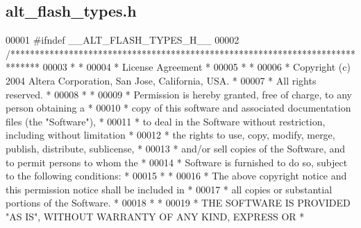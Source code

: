 \subsection{alt\+\_\+flash\+\_\+types.\+h}
\label{alt__flash__types_8h_source}

\begin{DoxyCode}
00001 \textcolor{preprocessor}{#ifndef \_\_ALT\_FLASH\_TYPES\_H\_\_}
00002 \textcolor{comment}{/******************************************************************************}
00003 \textcolor{comment}{*                                                                             *}
00004 \textcolor{comment}{* License Agreement                                                           *}
00005 \textcolor{comment}{*                                                                             *}
00006 \textcolor{comment}{* Copyright (c) 2004 Altera Corporation, San Jose, California, USA.           *}
00007 \textcolor{comment}{* All rights reserved.                                                        *}
00008 \textcolor{comment}{*                                                                             *}
00009 \textcolor{comment}{* Permission is hereby granted, free of charge, to any person obtaining a     *}
00010 \textcolor{comment}{* copy of this software and associated documentation files (the "Software"),  *}
00011 \textcolor{comment}{* to deal in the Software without restriction, including without limitation   *}
00012 \textcolor{comment}{* the rights to use, copy, modify, merge, publish, distribute, sublicense,    *}
00013 \textcolor{comment}{* and/or sell copies of the Software, and to permit persons to whom the       *}
00014 \textcolor{comment}{* Software is furnished to do so, subject to the following conditions:        *}
00015 \textcolor{comment}{*                                                                             *}
00016 \textcolor{comment}{* The above copyright notice and this permission notice shall be included in  *}
00017 \textcolor{comment}{* all copies or substantial portions of the Software.                         *}
00018 \textcolor{comment}{*                                                                             *}
00019 \textcolor{comment}{* THE SOFTWARE IS PROVIDED "AS IS", WITHOUT WARRANTY OF ANY KIND, EXPRESS OR  *}

\end{DoxyCode}
